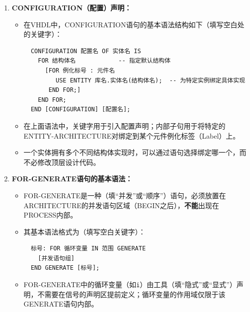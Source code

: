 \begin{enumerate}[label=\arabic*.]

\item \textbf{CONFIGURATION（配置）声明：}
\begin{itemize}
  \item 在VHDL中，CONFIGURATION语句的基本语法结构如下（填写空白处的关键字）：
  \begin{verbatim}
  CONFIGURATION 配置名 OF 实体名 IS
    FOR 结构体名            -- 指定默认结构体
      [FOR 例化标号 : 元件名
         USE ENTITY 库名.实体名(结构体名);  -- 为特定实例绑定具体实现
       END FOR;]
    END FOR;
  END [CONFIGURATION] [配置名];
  \end{verbatim}
  \item 在上面语法中，关键字\underline{\hspace{2.5cm}}用于引入配置声明；内部\underline{\hspace{2.5cm}}子句用于将特定的ENTITY-ARCHITECTURE对绑定到某个元件例化标签（Label）上。
  \item 一个实体拥有多个不同结构体实现时，可以通过\underline{\hspace{2.5cm}}语句选择绑定哪一个，而不必修改顶层设计代码。
\end{itemize}

\vspace{0.5cm}

\item \textbf{FOR-GENERATE语句的基本语法：}
\begin{itemize}
  \item FOR-GENERATE是一种\underline{\hspace{2.5cm}}（填“并发”或“顺序”）语句，必须放置在ARCHITECTURE的并发语句区域（BEGIN之后），\textbf{不能}出现在PROCESS内部。
  \item 其基本语法格式为（填写空白关键字）：
  \begin{verbatim}
  标号: FOR 循环变量 IN 范围 GENERATE
    [并发语句组]
  END GENERATE [标号];
  \end{verbatim}
  \item FOR-GENERATE中的循环变量（如\texttt{i}）由工具\underline{\hspace{2.5cm}}（填“隐式”或“显式”）声明，不需要在信号的声明区提前定义；循环变量的作用域仅限于该GENERATE语句内部。
\end{itemize}

\vspace{0.5cm}


\end{enumerate}
